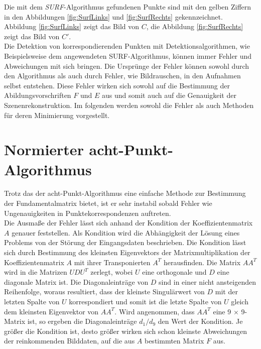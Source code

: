 Die mit dem \textit{SURF}-Algorithmus gefundenen Punkte sind mit den gelben Ziffern in den Abbildungen \ref{fig:SurfLinks} und \ref{fig:SurfRechts} gekennzeichnet. Abbildung \ref{fig:SurfLinks} zeigt das Bild von $C$, die Abbildung \ref{fig:SurfRechts} zeigt das Bild von $C'$.\\

Die Detektion von korrespondierenden Punkten mit Detektionsalgorithmen, wie Beispielsweise dem angewendeten SURF-Algorithmus, können immer Fehler und Abweichungen mit sich bringen. Die Ursprünge der Fehler können sowohl durch den Algorithmus als auch durch Fehler, wie Bildrauschen, in den Aufnahmen selbst entstehen. Diese Fehler wirken sich sowohl auf die Bestimmung der Abildungsvorschriften $F$ und $E$ aus und somit auch auf die Genauigkeit der Szenenrekonstruktion\cite{HZ}. Im folgenden werden sowohl die Fehler als auch Methoden für deren Minimierung vorgestellt.

\section{Normierter acht-Punkt-Algorithmus}

Trotz das der acht-Punkt-Algorithmus eine einfache Methode zur Bestimmung der Fundamentalmatrix bietet, ist er sehr instabil sobald Fehler wie Ungenauigkeiten in Punktekorrespondenzen  auftreten\cite{HZ,Brooks}.\\

Die Ausmaße der  Fehler lässt sich anhand der Kondition der Koeffizientenmatrix $A$ genauer feststellen. Als Kondition wird die Abhängigkeit der Lösung eines Problems von der Störung der Eingangsdaten beschrieben\cite{HZ8,ConditionNumber,Manocha}. Die Kondition lässt sich durch Bestimmung des kleinsten Eigenvektors der Matrixmultiplikation der Koeffizientenmatrix $A$ mit ihrer Transponierten $A^T$ herausfinden. Die Matrix $AA^T$ wird in die Matrizen $UDU^T$ zerlegt, wobei $U$ eine orthogonale und $D$ eine diagonale Matrix ist. Die Diagonaleinträge von $D$ sind in einer nicht ansteigenden Reihenfolge, woraus resultiert, dass der kleinste Singulärwert von $D$ mit der letzten Spalte von $U$ korrespondiert und somit ist die letzte Spalte von $U$ gleich dem kleinsten Eigenvektor von $AA^T$\cite{HZ8,ConditionNumber}. Wird angenommen, dass $AA^T$ eine 9 $\times$ 9- Matrix ist, so ergeben die Diagonaleinträge $d_1/d_9$ den Wert der Kondition. Je größer die Kondition ist, desto größer wirken sich schon kleinste Abweichungen der reinkommenden Bilddaten, auf die aus $A$ bestimmten Matrix $F$ aus.\\


